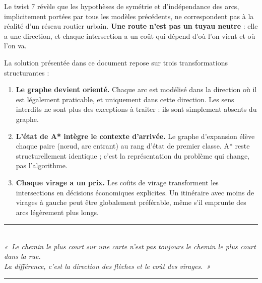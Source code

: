 \documentclass[12pt,a4paper]{article}
\theoremstyle{definition}
\theoremstyle{remark}
\begin{document}
Le twist 7 révèle que les hypothèses de symétrie et d'indépendance
des arcs, implicitement portées par tous les modèles précédents,
ne correspondent pas à la réalité d'un réseau routier urbain.
\textbf{Une route n'est pas un tuyau neutre} : elle a une direction,
et chaque intersection a un coût qui dépend d'où l'on vient et où
l'on va.

\medskip
La solution présentée dans ce document repose sur trois transformations
structurantes :

\begin{enumerate}[leftmargin=2em, itemsep=4pt]
  \item \textbf{Le graphe devient orienté.} Chaque arc est modélisé
    dans la direction où il est légalement praticable, et uniquement
    dans cette direction. Les sens interdits ne sont plus des exceptions
    à traiter : ils sont simplement absents du graphe.

  \item \textbf{L'état de A* intègre le contexte d'arrivée.}
    Le graphe d'expansion élève chaque paire (nœud, arc entrant) au
    rang d'état de premier classe. A* reste structurellement identique ;
    c'est la représentation du problème qui change, pas l'algorithme.

  \item \textbf{Chaque virage a un prix.} Les coûts de virage transforment
    les intersections en décisions économiques explicites. Un itinéraire
    avec moins de virages à gauche peut être globalement préférable, même
    s'il emprunte des arcs légèrement plus longs.
\end{enumerate}

\medskip
\begin{center}
  {\color{twist}\rule{0.5\linewidth}{1pt}}\\[0.5em]
  {\itshape «~Le chemin le plus court sur une carte
  n'est pas toujours le chemin le plus court dans la rue.\\
  La différence, c'est la direction des flèches
  et le coût des virages.~»}\\[0.5em]
  {\color{twist}\rule{0.5\linewidth}{1pt}}
\end{center}
\end{document}
